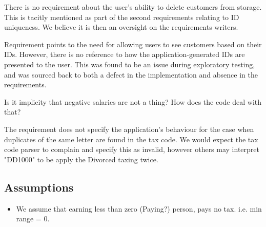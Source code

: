 There is no requirement about the user's ability to delete customers from storage. This is tacitly mentioned as part of the second requirements relating to ID uniqueness. We believe it is then an oversight on the requirements writers. 
\par
Requirement \RFour points to the need for allowing users to see customers based on their IDs. However, there is no reference to how the application-generated IDs are presented to the user. This was found to be an issue during exploratory testing, and was sourced back to both a defect in the implementation and absence in the requirements. 
\par
Is it implicity that negative salaries are not a thing? How does the code deal with that? 
\par
The requirement does not specify the application's behaviour for the case when duplicates of the same letter are found in the tax code. We would expect the tax code parser to complain and specify this as invalid, however others may interpret "DD1000" to be apply the Divorced taxing twice. 

\subsection{Assumptions}


\begin{itemize}
	\item We assume that earning less than zero (Paying?) person, pays no tax. i.e. min range = 0. 
\end{itemize}

